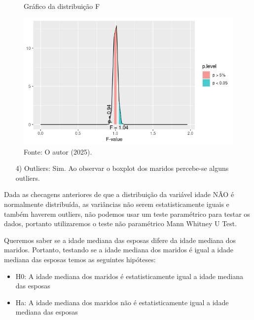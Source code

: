 \begin{figure}[H]
\centering
\caption{Gráfico da distribuição F}
\includegraphics[width=.9\textwidth]{apendices/fig/4_IAA004_5.png} 
\caption*{Fonte: O autor (2025).}
\label{fig:subim1}
\end{figure}

\begin{enumerate}
    \item[4)] Outliers: Sim. Ao observar o boxplot dos maridos percebe-se alguns outliers.
\end{enumerate}

Dada as checagens anteriores de que a distribuição da variável idade NÃO é normalmente distribuída, as variâncias não serem estatisticamente iguais e também haverem outliers, não podemos usar um teste paramétrico para testar os dados, portanto utilizaremos o teste não paramétrico Mann Whitney U Test.

Queremos saber se a idade mediana das esposas difere da idade mediana dos maridos. Portanto, testando se a idade mediana dos maridos é igual a idade mediana das esposas temos as seguintes hipóteses:

\begin{itemize}
\item  H0: A idade mediana dos maridos é estatisticamente igual a idade mediana das esposas
\item  Ha: A idade mediana dos maridos não é estatisticamente igual a idade mediana das esposas\hfill \break
\end{itemize}

